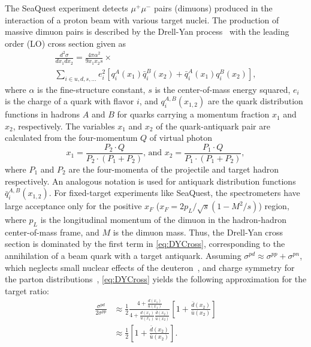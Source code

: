 \documentclass[reprint,aps,unsortedaddress,superscriptaddress,prl,floatfix,showpacs,linenumbers]{revtex4-2}
\begin{document}
The SeaQuest experiment detects $\mu^+\mu^-$ pairs (dimuons) produced in
the interaction of a proton beam with various target nuclei. The production
of massive dimuon pairs is described by the Drell-Yan
process~\cite{drell1970} with the leading order (LO) cross section given as
\begin{multline}
	\frac{d^2\sigma}{dx_1dx_2}=\frac{4\pi \alpha^2}{9x_1x_2s} \times
	\label{eq:DYCross} \\
	\sum_{i\in u,d,s,\dots} e_i^2 \left[q_i^A\left(x_1\right) \bar q_i^B\left(x_2\right) + \bar q_i^A\left(x_1\right)
		q_i^B\left(x_2\right)\right],
\end{multline}
where $\alpha$ is the fine-structure constant,
$s$ is the center-of-mass energy squared,
$e_i$ is the charge of a quark
with flavor $i$, and $q_i^{A,B}\left(x_{1,2}\right)$ are the quark
distribution functions in hadrons $A$ and $B$
for quarks carrying a momentum fraction $x_1$ and $x_2$, respectively.
The variables $x_1$ and $x_2$ of the quark-antiquark pair are calculated from the four-momentum $Q$ of virtual photon
\begin{equation}
	x_1 = \frac{P_2 \cdot Q}{P_2 \cdot \left(P_1+P_2\right)} \text{, and } x_2 =
	\frac{P_1 \cdot Q}{P_1 \cdot \left(P_1+P_2\right)},
	\label{def_x1x2}
\end{equation}
where $P_1$ and $P_2$ are the four-momenta of the projectile and target hadron respectively.
An analogous notation is used for antiquark distribution functions
$\bar q_i^{A,B}\left(x_{1,2}\right)$.
For fixed-target experiments like SeaQuest, the spectrometers have
large acceptance only for the positive $x_F$ ($x_F = 2p_L/\sqrt{s}\left(1-M^2/s\right)$) region,
where $p_L$ is the longitudinal momentum of the dimuon in the hadron-hadron center-of-mass frame,
and $M$ is the dimuon mass.
Thus, the Drell-Yan cross section is dominated by
the first term in \cref{eq:DYCross}, corresponding to the annihilation of a beam quark with
a target antiquark. Assuming
$\sigma^{pd} \approx \sigma^{pp} + \sigma^{pn}$,
which neglects small nuclear effects of the
deuteron~\cite{kumano1998,ehlers2014},
and charge symmetry for the parton distributions~\cite{londergan2010},
\cref{eq:DYCross} yields the following approximation for the target ratio:
\begin{equation}
	\begin{split}
		\frac{\sigma^{pd}}{2\sigma^{pp}} & \approx
		\frac{1}{2} \frac{4+\frac{d\left(x_1\right)}
			{u\left(x_1\right)}}{4+\frac{d\left(x_1\right)}
			{u\left(x_1\right)}\frac{\bar d\left(x_2\right)}{\bar u\left(x_2\right)}}
		\left[1+\frac{\bar d\left(x_2\right)}{\bar u\left(x_2\right)}\right]                         \\
		                                 & \approx \frac{1}{2} \left[1+\frac{\bar d\left(x_2\right)}
			{\bar u\left(x_2\right)}\right].
	\end{split}
	\label{eq:crRatio}
\end{equation}
\end{document}
